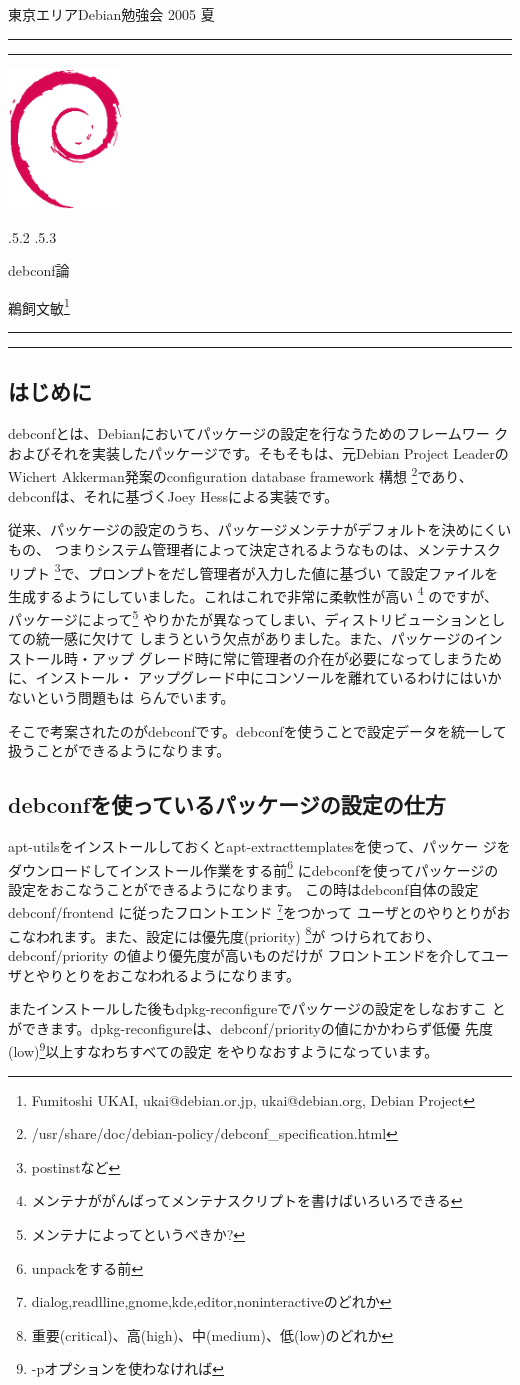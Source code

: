 \documentclass[mingoth,a4paper]{jsarticle}
\makeatletter
\renewcommand{\section}{\@startsection{section}{1}{\z@}%
    {\Cvs \@plus.5\Cdp \@minus.2\Cdp}%
    {.5\Cvs \@plus.3\Cdp}%
    {\normalfont\Large\headfont\raggedright\centering}} %
\newcommand{\dancersection}[2]{%
\newpage
東京エリアDebian勉強会 2005 夏
\hrule
\vspace{0.5mm}
\hrule
\hfill{}\includegraphics[width=3cm]{image200502/openlogo-nd.eps}\\
\vspace{-4cm}
\begin{center}
  \section{#1}
\end{center}
\hfill{}#2\hspace{3cm}\space\\
\hrule
\hrule
\vspace{1cm}
}
\makeatother
\begin{document}
\dancersection{debconf論}{鵜飼文敏\footnote{Fumitoshi UKAI, ukai@debian.or.jp, ukai@debian.org, Debian Project}}
\label{sec:ukai}
\subsection{はじめに}

debconfとは、Debianにおいてパッケージの設定を行なうためのフレームワー
クおよびそれを実装したパッケージです。そもそもは、元Debian Project
LeaderのWichert Akkerman発案のconfiguration database framework 構想
\footnote{/usr/share/doc/debian-policy/debconf\_specification.html}であり、
debconfは、それに基づくJoey Hessによる実装です。

従来、パッケージの設定のうち、パッケージメンテナがデフォルトを決めにくいもの、
つまりシステム管理者によって決定されるようなものは、メンテナスクリプト
\footnote{postinstなど}で、プロンプトをだし管理者が入力した値に基づい
て設定ファイルを生成するようにしていました。これはこれで非常に柔軟性が高い
\footnote{メンテナががんばってメンテナスクリプトを書けばいろいろできる} 
のですが、パッケージによって\footnote{メンテナによってというべきか?} 
やりかたが異なってしまい、ディストリビューションとしての統一感に欠けて
しまうという欠点がありました。また、パッケージのインストール時・アップ
グレード時に常に管理者の介在が必要になってしまうために、インストール・
アップグレード中にコンソールを離れているわけにはいかないという問題もは
らんでいます。

そこで考案されたのがdebconfです。debconfを使うことで設定データを統一して
扱うことができるようになります。

\subsection{debconfを使っているパッケージの設定の仕方}

apt-utilsをインストールしておくとapt-extracttemplatesを使って、パッケー
ジをダウンロードしてインストール作業をする前\footnote{unpackをする前}
にdebconfを使ってパッケージの設定をおこなうことができるようになります。
この時はdebconf自体の設定 debconf/frontend に従ったフロントエンド
\footnote{dialog,readlline,gnome,kde,editor,noninteractiveのどれか}をつかって
ユーザとのやりとりがおこなわれます。また、設定には優先度(priority)
\footnote{重要(critical)、高(high)、中(medium)、低(low)のどれか}が
つけられており、debconf/priority の値より優先度が高いものだけが
フロントエンドを介してユーザとやりとりをおこなわれるようになります。

またインストールした後もdpkg-reconfigureでパッケージの設定をしなおすこ
とができます。dpkg-reconfigureは、debconf/priorityの値にかかわらず低優
先度(low)\footnote{-pオプションを使わなければ}以上すなわちすべての設定
をやりなおすようになっています。
\end{document}
